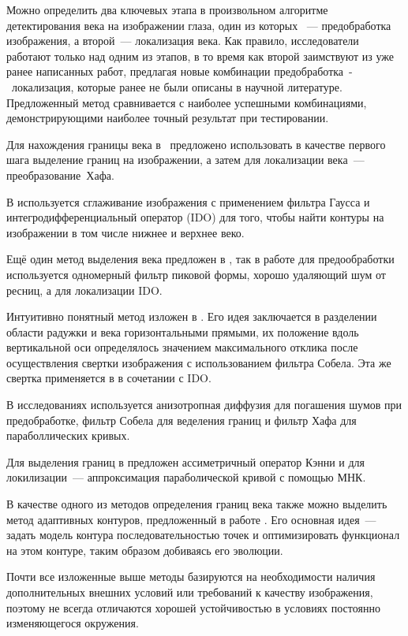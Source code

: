 \documentclass[12pt]{article} %
\begin{document}
Можно определить два ключевых этапа в произвольном алгоритме детектирования века на изображении глаза, один из которых ~--- предобработка изображения, а второй~--- локализация века. Как правило, исследователи работают только над одним из этапов, в то время как второй заимствуют из уже ранее написанных работ, предлагая новые комбинации предобработка~-~локализация, которые ранее не были описаны в научной литературе. Предложенный метод сравнивается с наиболее успешными комбинациями, демонстрирующими наиболее точный результат при тестировании.

Для нахождения границы века в~\cite{Wildes} предложено использовать в качестве первого шага выделение границ на изображении, а затем для локализации века~--- преобразование~Хафа. 

В \cite{Daugman} используется сглаживание изображения с применением фильтра Гаусса и интегродифференциальный оператор
(IDO) для того, чтобы найти контуры на изображении в том числе нижнее и верхнее веко.

Ещё один метод выделения века предложен в \cite{KKX}, так в работе для предообработки используется одномерный фильтр пиковой формы, хорошо удаляющий шум от ресниц, а для локализации IDO.

Интуитивно понятный метод изложен в \cite{Masek}. Его идея заключается в разделении области радужки и века горизонтальными прямыми, их положение вдоль вертикальной оси определялось значением максимального отклика после осуществления свертки изображения с использованием фильтра Собела. Эта же свертка применяется в \cite{KP} в сочетании с IDO. 

В исследованиях \cite{Adam_2, Adam_1} используется анизотропная диффузия для погашения шумов при предобработке, фильтр Собела для веделения границ и фильтр Хафа для параболлических кривых. 

Для выделения границ в \cite{Yang} предложен ассиметричный оператор Кэнни и для локилизации~--- аппроксимация параболической кривой с помощью МНК. 

В качестве одного из методов определения границ века также можно выделить метод адаптивных контуров, предложенный в работе \cite{Smirn}. Его основная идея~--- задать модель контура последовательностью точек и оптимизировать функционал на этом контуре, таким образом добиваясь его эволюции.

Почти все изложенные выше методы базируются на необходимости наличия дополнительных внешних условий или требований к качеству изображения, поэтому не всегда отличаются хорошей устойчивостью в условиях постоянно изменяющегося окружения. 
\end{document}
